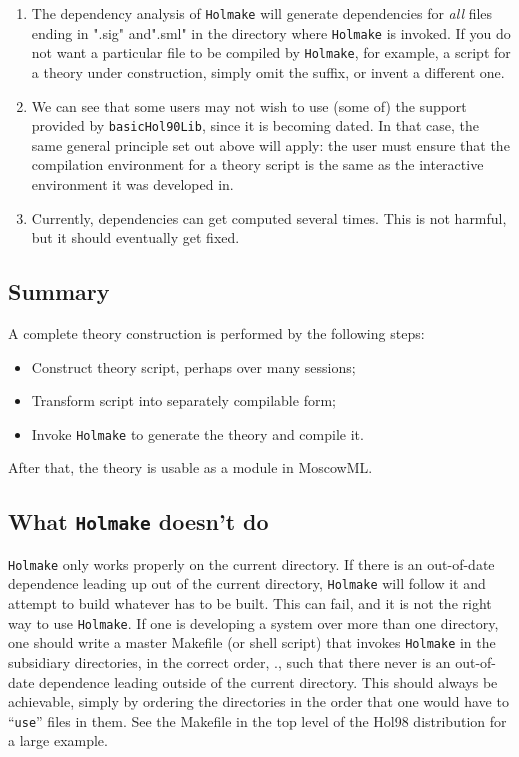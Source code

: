 \begin{enumerate}
\item The dependency analysis of {\tt Holmake} will generate dependencies for
{\it all\/} files ending in ".sig" and".sml" in the directory where
{\tt Holmake} is invoked. If you do not want a particular file to be compiled
by {\tt Holmake}, for example, a script for a theory under construction,
simply omit the suffix, or invent a different one.


\item We can see that some users may not wish to use (some of) the
support provided by \verb+basicHol90Lib+, since it is becoming dated. In
that case, the same general principle set out above will apply: the user
must ensure that the compilation environment for a theory script is the
same as the interactive environment it was developed in.

\item Currently, dependencies can get computed several times. This is
not harmful, but it should eventually get fixed.

\end{enumerate}


\subsection{Summary}

A complete theory construction is performed by the following steps:
\begin{itemize}
\item Construct theory script, perhaps over many sessions;
\item Transform script into separately compilable form;
\item Invoke {\tt Holmake} to generate the theory and compile it.
\end{itemize}

After that, the theory is usable as a module in MoscowML.


\subsection{What {\tt Holmake} doesn't do}

{\tt Holmake} only works properly on the current directory. If there is an
out-of-date dependence leading up out of the current directory, {\tt Holmake}
will follow it and attempt to build whatever has to be built. This can
fail, and it is not the right way to use {\tt Holmake}.  If one is developing
a system over more than one directory, one should write a master
Makefile (or shell script) that invokes {\tt Holmake} in the subsidiary
directories, in the correct order, \ie., such that there never is an
out-of-date dependence leading outside of the current directory. This
should always be achievable, simply by ordering the directories in the
order that one would have to ``\verb+use+'' files in them. See the
Makefile in the top level of the Hol98 distribution for a large example.


